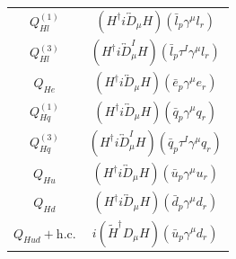 \begin{table}[htbp]
{\begin{tabular}[t]{c|c}
        \cellcolor{gray!25}$Q_{Hl}^{(1)}$ & \cellcolor{gray!25}$(H^\dagger i\overleftrightarrow{D}_\mu H)(\bar{l}_p \gamma^\mu l_r)$ \\
        \cellcolor{gray!25}$Q_{Hl}^{(3)}$ & \cellcolor{gray!25}$(H^\dagger i\overleftrightarrow{D}^I_\mu H)(\bar{l}_p \tau^I \gamma^\mu l_r)$ \\
        \cellcolor{gray!25}$Q_{He}$ & \cellcolor{gray!25}$(H^\dagger i\overleftrightarrow{D}_\mu H)(\bar{e}_p \gamma^\mu e_r)$ \\
        $Q_{Hq}^{(1)}$ & $(H^\dagger i\overleftrightarrow{D}_\mu H)(\bar{q}_p \gamma^\mu q_r)$ \\
        $Q_{Hq}^{(3)}$ & $(H^\dagger i\overleftrightarrow{D}^I_\mu H)(\bar{q}_p \tau^I \gamma^\mu q_r)$ \\
        $Q_{Hu}$ & $(H^\dagger i\overleftrightarrow{D}_\mu H)(\bar{u}_p \gamma^\mu u_r)$ \\
        $Q_{Hd}$ & $(H^\dagger i\overleftrightarrow{D}_\mu H)(\bar{d}_p \gamma^\mu d_r)$ \\
        $Q_{Hud} + \text{h.c.}$ & $i(\widetilde{H}^\dagger D_\mu H)(\bar{u}_p \gamma^\mu d_r)$
    \end{tabular}
    } %
    

\end{table}
